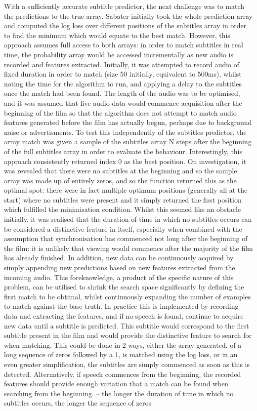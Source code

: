 With a sufficiently accurate subtitle predictor, the next challenge was to match the predictions to the  true array. Sabater initially took the whole prediction array and computed the log loss over different positions of the subtitles array in order to find the minimum which would equate to the best match. However, this approach assumes full access to both arrays: in order to match subtitles in real time, the probability array would be accessed incrementally as new audio is recorded and features extracted. Initially, it was attempted to record audio of fixed duration in order to match (size 50 initially, equivalent to 500ms), whilst noting the time for the algorithm to run, and applying a delay to the subtitles once the match had been found. The length of the audio was to be optimised, and it was assumed that live audio data would commence acquisition after the beginning of the film so that the algorithm does not attempt to match audio features generated before the film has actually begun, perhaps due to background noise or advertisments. To test this independently of the subtitles predictor, the array match was given a sample of the subtitles array N steps after the beginning of the full subtitles array in order to evaluate the behaviour. Interestingly, this approach consistently returned index 0 as the best position. On investigation, it was revealed that there were no subtitles at the beginning and so the sample array was made up of entirely zeros, and so the function returned this as the optimal spot: there were in fact multiple optimum positions (generally all at the start) where no subtitles were present and it simply returned the first position which fulfilled the minimisation condition. Whilst this seemed like an obstacle initially, it was realised that the duration of time in which no subtitles occurs can be considered a distinctive feature in itself, especially when combined with the assumption that synchronisation has commenced not long after the beginning of the film: it is unlikely that viewing would commence after the majority of the film has already finished. In addition, new data can be continuously acquired by simply appending new predictions based on new features extracted from the incoming audio. This foreknowledge, a product of the specific nature of this problem, can be utilised to shrink the search space significantly by defining the first match to be obtimal, whilst continuously expanding the number of examples to match against the base truth. In practice this is implemented by recording data and extracting the features, and if no speech is found, continue to acquire new data until a subtitle is predicted. This subtitle would correspond to the first subtitle present in the film and would provide the distinctive feature to search for when matching. This could be done in 2 ways, either the array generated, of a long sequence of zeros followed by a 1, is matched using the log loss, or in an even greater simplification, the subtitles are simply commenced as soon as this is detected. Alternatively, if speech commences from the beginning, the recorded features should provide enough variation that a match can be found when searching from the beginning.
– the longer the duration of time in which no subtitles occurs, the longer the sequence of zeros 
